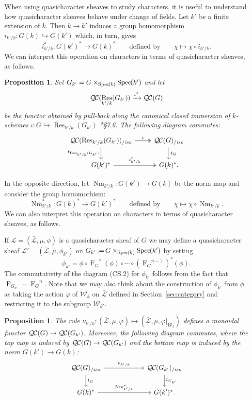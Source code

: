 \documentclass[11pt]{amsart}
\theoremstyle{plain}
\newtheorem{proposition}[theorem]{Proposition}
\theoremstyle{definition}
\theoremstyle{remark}
\newcommand{\Spec}[1]{{\operatorname{Spec}\hskip-1pt( #1 )}}
\newcommand{\Fq}{k}
\newcommand{\Frob}[1]{{\operatorname{F}_{#1}}}
\DeclareMathOperator{\Res}{Res}
\DeclareMathOperator{\Nm}{Nm}
\newcommand{\ceq}{{\, :=\, }}
\newcommand{\cs}[1]{{\mathcal{#1}}}
\newcommand{\gcs}[1]{{\mathcal{\bar #1}}}
\newcommand{\QC}{{\mathcal{Q\hskip-0.8pt C}}}
\newcommand{\QCiso}[1]{\QC(#1)_{/\textit{iso}}}
\newcommand{\Weil}[1]{\mathcal{W}_{#1}}
\newcommand{\trFrob}[1]{t_{#1}}
\newcommand\Clifton[1]{\marginpar{\smaller\smaller CC: #1}}
\begin{document}
When using quasicharacter sheaves to study characters, it is useful to understand
how quasicharacter sheaves behave under change of fields.
Let $k'$ be a finite extension of $k$. Then $k\to k'$ induces a group homomorphism $i_{k'/k} : G(k) \hookrightarrow G(k')$ which, in turn, gives
\[
i_{k'/k}^* : G(k')^* \to G(k)^* \qquad \text{defined by}\qquad \chi \mapsto \chi\circ i_{k'/k}.
\]
We can interpret this operation on characters in terms of quasicharacter sheaves, as follows.
%

\begin{proposition} \label{prop:csbe}
Set $G_{k'} = G\times_\Spec{k} \Spec{k'}$ and let
\[
\QC(\Res_{k'/k}(G_{k'})) \xrightarrow{\iota^*} \QC(G)
\]
be the functor obtained by pull-back along the canonical closed immersion of $k$-schemes  $\iota : G \hookrightarrow \Res_{k'/k}(G_{k'})$ \cite{BLR}*{\S 7.6}. 
The following diagram commutes:
\[
\begin{tikzcd}
\QCiso{\Res_{k'/k}(G_{k'})} \arrow[two heads]{r}{\iota} \dar[swap]{t_{\Res_{k'/k}(G_{k'})}} & \QCiso{G} \dar{t_G} \\
G(k')^* \arrow[two heads]{r}{i_{k'/k}^*} & G(k)^*.
\end{tikzcd}
\]
\end{proposition}

In the opposite direction, let $\Nm_{k'/k} : G(k') \to G(k)$ be the norm map and consider the group homomorhism:
\Clifton{How is $\Nm$ defined?}
\[
\Nm_{k'/k}^* : G(k)^* \to G(k')^* \qquad \text{defined by}\qquad \chi \mapsto \chi\circ \Nm_{k'/k}.
\]
We can also interpret this operation on characters in terms of quasicharacter sheaves, as follows.

If $\cs{L} = (\gcs{L}, \mu, \phi)$ is a quasicharacter sheaf of $G$ we may define
a quasicharacter sheaf $\cs{L}' = (\gcs{L}, \mu, \phi_{k'})$ on 
$G_{k'}\ceq G\times_{\Spec{k}} \Spec{k'}$ by setting
\[
\phi_{k'} = \phi \circ \Frob{G}^*(\phi) \circ \cdots \circ (\Frob{G}^{n-1})^*(\phi).
\]
The commutativity of the diagram (CS.2) for $\phi_{k'}$ 
follows from the fact that $\Frob{G_{k'}} = \Frob{G}^n$.
Note that we may also think about the construction of $\phi_{k'}$ from $\phi$
as taking the action $\varphi$ of $\Weil{k}$ on $\gcs{L}$ 
defined in Section~\ref{sec:category} and restricting it to the subgroup $\Weil{k'}$.

\begin{proposition}\label{prop:basechange}
 The rule $\nu_{k'/k}: (\gcs{L}, \mu, \varphi) \mapsto (\gcs{L}, \mu, \varphi\vert_{\Weil{\Fq}})$ 
 defines a monoidal functor $\QC(G) \to \QC(G_{k'})$. 
 Moreover, the following diagram commutes, 
 where the top map is induced by $\QC(G) \to \QC(G_{k'})$ 
 and the bottom map is induced by the norm $G(k') \rightarrow G(k)$:
\[
\begin{tikzcd}[column sep=60]
\QCiso{G} \rar{\nu_{k'/k}} \dar{\trFrob{G}} & \QCiso{G_{k'}} \dar{\trFrob{G_{k'}}} \\
G(k)^*  \rar{\Nm_{k'/k}^*} & G(k')^*.
\end{tikzcd}
\]
\end{proposition}
\end{document}
